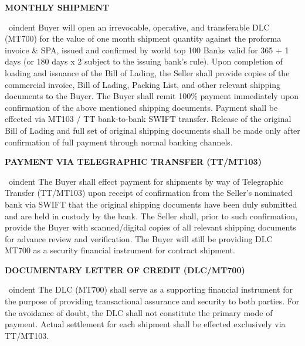 \documentclass[a4paper,11pt]{article}
\begin{document}
\vspace{0.3cm}
\begin{center}{\large\textbf{\color{marooncolor}MONTHLY SHIPMENT}}\end{center}
\vspace{0.1cm}
\
oindent Buyer will open an irrevocable, operative, and transferable DLC (MT700) for the value of one month shipment quantity against the proforma invoice \& SPA, issued and confirmed by world top 100 Banks valid for 365 + 1 days (or 180 days x 2 subject to the issuing bank's rule). Upon completion of loading and issuance of the Bill of Lading, the Seller shall provide copies of the commercial invoice, Bill of Lading, Packing List, and other relevant shipping documents to the Buyer. The Buyer shall remit 100\% payment immediately upon confirmation of the above mentioned shipping documents. Payment shall be effected via MT103 / TT bank-to-bank SWIFT transfer. Release of the original Bill of Lading and full set of original shipping documents shall be made only after confirmation of full payment through normal banking channels.

\vspace{0.3cm}
\begin{center}{\large\textbf{\color{marooncolor}PAYMENT VIA TELEGRAPHIC TRANSFER (TT/MT103)}}\end{center}
\vspace{0.1cm}
\
oindent The Buyer shall effect payment for shipments by way of Telegraphic Transfer (TT/MT103) upon receipt of confirmation from the Seller's nominated bank via SWIFT that the original shipping documents have been duly submitted and are held in custody by the bank. The Seller shall, prior to such confirmation, provide the Buyer with scanned/digital copies of all relevant shipping documents for advance review and verification. The Buyer will still be providing DLC MT700 as a security financial instrument for contract shipment.

\vspace{0.3cm}
\begin{center}{\large\textbf{\color{marooncolor}DOCUMENTARY LETTER OF CREDIT (DLC/MT700)}}\end{center}
\vspace{0.1cm}
\
oindent The DLC (MT700) shall serve as a supporting financial instrument for the purpose of providing transactional assurance and security to both parties. For the avoidance of doubt, the DLC shall not constitute the primary mode of payment. Actual settlement for each shipment shall be effected exclusively via TT/MT103.
\end{document}

